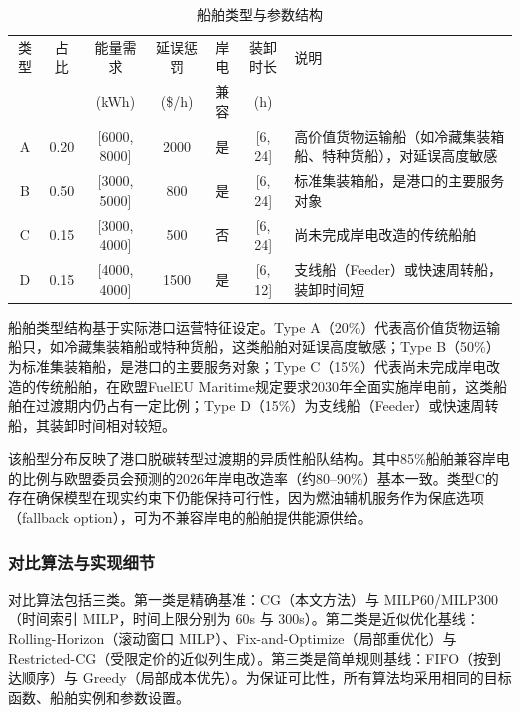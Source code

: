 \documentclass[UTF8, a4paper, 12pt]{ctexart}
\theoremstyle{plain}
\theoremstyle{definition}
\theoremstyle{remark}
\begin{document}
\begin{table}[htbp]
    \centering
    \caption{船舶类型与参数结构}
    \label{tab:ship_types}
    \scriptsize
    \renewcommand{\arraystretch}{1.3}
    \begin{threeparttable}
    \begin{tabular}{c c c c c c p{4cm}}
        \toprule
        类型 & 占比 & 能量需求 & 延误惩罚 & 岸电 & 装卸时长 & 说明 \\
        & & (kWh) & (\$/h) & 兼容 & (h) & \\
        \midrule
        A & 0.20 & [6000, 8000] & 2000 & 是 & [6, 24] & 高价值货物运输船（如冷藏集装箱船、特种货船），对延误高度敏感 \\
        \addlinespace
        B & 0.50 & [3000, 5000] & 800 & 是 & [6, 24] & 标准集装箱船，是港口的主要服务对象 \\
        \addlinespace
        C & 0.15 & [3000, 4000] & 500 & 否 & [6, 24] & 尚未完成岸电改造的传统船舶 \\
        \addlinespace
        D & 0.15 & [4000, 4000] & 1500 & 是 & [6, 12] & 支线船（Feeder）或快速周转船，装卸时间短 \\
        \bottomrule
    \end{tabular}
    \end{threeparttable}
\end{table}

船舶类型结构基于实际港口运营特征设定。Type A（20\%）代表高价值货物运输船只，如冷藏集装箱船或特种货船，这类船舶对延误高度敏感；Type B（50\%）为标准集装箱船，是港口的主要服务对象；Type C（15\%）代表尚未完成岸电改造的传统船舶，在欧盟FuelEU Maritime规定\cite{EU2025}要求2030年全面实施岸电前，这类船舶在过渡期内仍占有一定比例；Type D（15\%）为支线船（Feeder）或快速周转船，其装卸时间相对较短。

该船型分布反映了港口脱碳转型过渡期的异质性船队结构。其中85\%船舶兼容岸电的比例与欧盟委员会预测的2026年岸电改造率（约80--90\%）基本一致。类型C的存在确保模型在现实约束下仍能保持可行性，因为燃油辅机服务作为保底选项（fallback option），可为不兼容岸电的船舶提供能源供给。

\subsubsection{对比算法与实现细节}
\label{sec:baselines_impl}
对比算法包括三类。第一类是精确基准：CG（本文方法）与 MILP60/MILP300（时间索引 MILP，时间上限分别为 60s 与 300s）。第二类是近似优化基线：Rolling-Horizon（滚动窗口 MILP）、Fix-and-Optimize（局部重优化）与 Restricted-CG（受限定价的近似列生成）。第三类是简单规则基线：FIFO（按到达顺序）与 Greedy（局部成本优先）。为保证可比性，所有算法均采用相同的目标函数、船舶实例和参数设置。
\end{document}
